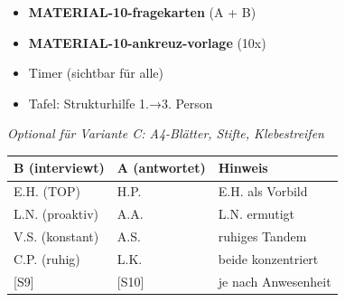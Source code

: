 \documentclass[11pt, a4paper]{article}
\begin{document}
\vspace{0.2cm}


\begin{minipage}[t]{0.48\textwidth}
\begin{tcolorbox}[
    colback=hellgrau,
    colframe=phase,
    title={\footnotesize\bfseries Material-Checkliste},
    fonttitle=\bfseries,
    boxrule=0.5pt,
    top=2pt, bottom=2pt, left=4pt, right=4pt
]
\footnotesize
\begin{itemize}
\item[$\square$] \textbf{MATERIAL-10-fragekarten} (A + B)
\item[$\square$] \textbf{MATERIAL-10-ankreuz-vorlage} (10x)
\item[$\square$] Timer (sichtbar für alle)
\item[$\square$] Tafel: Strukturhilfe 1.→3. Person
\end{itemize}

\vspace{0.1cm}
\textit{Optional für Variante C: A4-Blätter, Stifte, Klebestreifen}
\end{tcolorbox}
\end{minipage}
\hfill
\begin{minipage}[t]{0.48\textwidth}
\begin{tcolorbox}[
    colback=gruppeB!10,
    colframe=gruppeB,
    title={\footnotesize\bfseries Tandem-Zuordnung (Variante A)},
    fonttitle=\bfseries,
    boxrule=0.5pt,
    top=2pt, bottom=2pt, left=4pt, right=4pt
]
\footnotesize
\begin{tabular}{@{}lll@{}}
\textbf{B (interviewt)} & \textbf{A (antwortet)} & \textbf{Hinweis} \\
\hline
E.H. (TOP) & H.P. & E.H. als Vorbild \\
L.N. (proaktiv) & A.A. & L.N. ermutigt \\
V.S. (konstant) & A.S. & ruhiges Tandem \\
C.P. (ruhig) & L.K. & beide konzentriert \\
{[S9]} & {[S10]} & je nach Anwesenheit \\
\end{tabular}
\end{tcolorbox}
\end{minipage}

\vspace{0.2cm}
\end{document}
